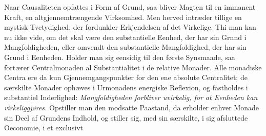 \documentclass[12pt]{book}
\newcommand{\opage}[1]{\marginnote{\footnotesize\textit{[#1]}}}
\begin{document}
Naar Causaliteten opfattes i Form af Grund, saa bliver Magten til en immanent Kraft, en
altgjennemtrængende Virksomhed. Men herved intræder tillige en mystisk Tvetydighed, der
fordunkler Erkjendelsen af det Virkelige. Thi
\opage{173} %
%
%
%
man kan nu ikke vide, om det skal være den substantielle Eenhed, der har sin Grnnd i
Mangfoldigheden, eller omvendt den substantielle Mangfoldighed, der har sin Grund i
Eenheden. Holder man sig eensidig til den første Synsmaade, saa fortærer
Centralmonaden al Substantialitet i de relative Monader. Alle monadiske Centra ere da
kun Gjennemgangspunkter for den ene absolute Centralitet; de særskilte Monader ophæves
i Urmonadens energiske Reflexion, og fastholdes i substantiel Inderlighed:
\emph{Mangfoldigheden forbliver uvirkelig, for at Eenheden kan virkeliggjøres.}
Opstiller man den modsatte Paastand, da erholder enhver Monade sin Deel af Grundens
Indhold, og stiller sig, med sin særskilte, i sig afsluttede Oeconomie, i et exclusivt
\end{document}
